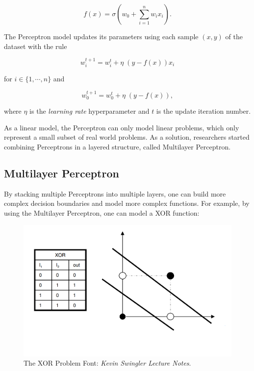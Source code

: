 \begin{equation}
    f(x) = \sigma(w_0 + \sum_{i = 1}^{n} w_i x_i).
    \label{eq:perceptron}
\end{equation}

The Perceptron model updates its parameters using each sample \((x, y)\) of the dataset with the rule

\begin{equation}
    w_i^{t + 1} = w_i^t + \eta \; (y - f(x)) x_i
    \label{eq:perceptron_update}  
\end{equation}

for \(i \in \{1, \cdots, n\}\) and

\begin{equation}
    w_0^{t + 1} = w_0^t + \eta \; (y - f(x)),  
\end{equation}

where \(\eta\) is the \emph{learning rate} hyperparameter and \(t\) is the update iteration number.

As a linear model, the Perceptron can only model linear problems, which only represent a small subset of real world problems.
As a solution, researchers started combining Perceptrons in a layered structure, called Multilayer Perceptron.

\subsection{Multilayer Perceptron}

By stacking multiple Perceptrons into multiple layers, one can build more complex decision boundaries and model more complex functions. 
For example, by using the Multilayer Perceptron, one can model a XOR function: 

\begin{figure}
    \centering
    \includegraphics[scale=0.4]{figuras/xor_problem.png}
    \caption{The XOR Problem Font: \emph{Kevin Swingler Lecture Notes}. \label{fig:xor_problem}}
\end{figure}

